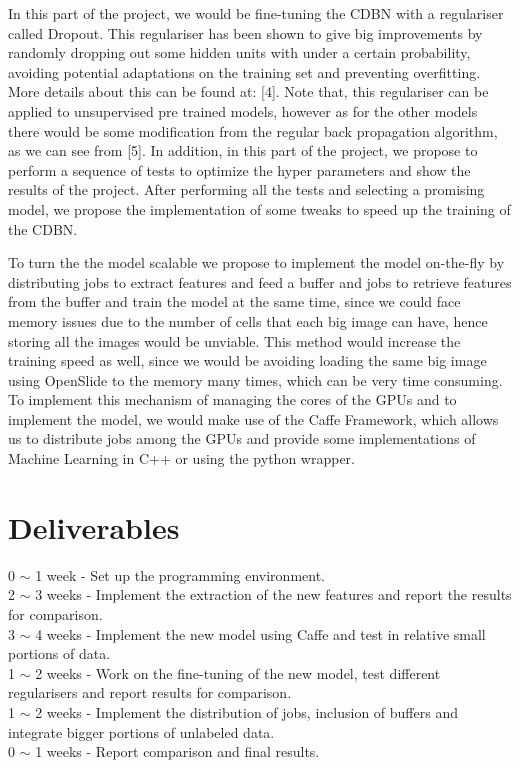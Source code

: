 \documentclass{article}
\begin{document}
	In this part of the project, we would be fine-tuning the CDBN with a regulariser called Dropout. This regulariser has been shown to give big improvements by randomly dropping out some hidden units with under a certain probability, avoiding potential adaptations on the training set and preventing overfitting. More details about this can be found at: [4]. Note that, this regulariser can be applied to unsupervised pre trained models, however as for the other models there would be some modification from the regular back propagation algorithm, as we can see from [5]. In addition, in this part of the project, we propose to perform a sequence of tests to optimize the hyper parameters and show the results of the project. After performing all the tests and selecting a promising model, we propose the implementation of some tweaks to speed up the training of the CDBN.\par To turn the the model scalable we propose to implement the model on-the-fly by distributing jobs to extract features and feed a buffer and jobs to retrieve features from the buffer and train the model at the same time, since we could face memory issues due to the number of cells that each big image can have, hence storing all the images would be unviable. This method would increase the training speed as well, since we would be avoiding loading the same big image using OpenSlide to the memory many times, which can be very time consuming. To implement this mechanism of managing the cores of the GPUs and to implement the model, we would make use of the Caffe Framework, which allows us to distribute jobs among the GPUs and provide some implementations of Machine Learning in C++ or using the python wrapper.
	
\section{Deliverables}

\setlength\parindent{0pt} 0 $\sim$ 1 week - Set up the programming environment.\\
2 $\sim$ 3 weeks - Implement the extraction of the new features and report the results for comparison.\\
3 $\sim$ 4 weeks - Implement the new model using Caffe and test in relative small portions of data.\\
1 $\sim$ 2 weeks - Work on the fine-tuning of the new model, test different regularisers and report results for comparison.\\
1 $\sim$ 2 weeks - Implement the distribution of jobs, inclusion of buffers and integrate bigger portions of unlabeled data.\\
0 $\sim$ 1 weeks - Report comparison and final results.
\end{document}
